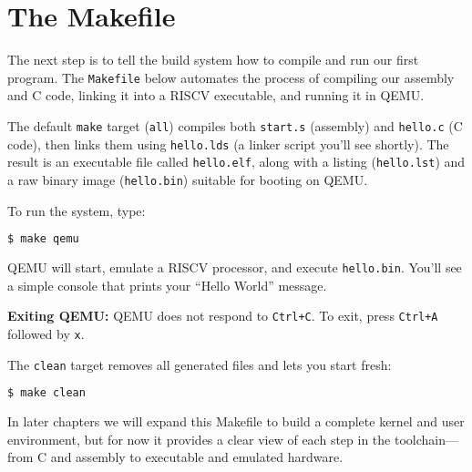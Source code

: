 \section{The Makefile}

The next step is to tell the build system how to compile and run our first
program.  The \texttt{Makefile} below automates the process of compiling our
assembly and C code, linking it into a RISC\textendash V executable, and running
it in QEMU.

\begin{figure}[H]
\centering
\begin{minipage}{0.95\textwidth}

\end{minipage}
\end{figure}

The default \texttt{make} target (\texttt{all}) compiles both
\texttt{start.s} (assembly) and \texttt{hello.c} (C code), then links them
using \texttt{hello.lds} (a linker script you’ll see shortly).  The result is an
executable file called \texttt{hello.elf}, along with a listing
(\texttt{hello.lst}) and a raw binary image (\texttt{hello.bin}) suitable for
booting on QEMU.

To run the system, type:

\begin{lstlisting}[style=oscode,language=bash]
$ make qemu
\end{lstlisting}

QEMU will start, emulate a RISC\textendash V processor, and execute
\texttt{hello.bin}.  You’ll see a simple console that prints your
``Hello World'' message.

\medskip
\noindent
\textbf{Exiting QEMU:}  
QEMU does not respond to \texttt{Ctrl+C}.  
To exit, press \texttt{Ctrl+A} followed by \texttt{x}.

\medskip
The \texttt{clean} target removes all generated files and lets you start fresh:

\begin{lstlisting}[style=oscode,language=bash]
$ make clean
\end{lstlisting}

In later chapters we will expand this Makefile to build a complete kernel and
user environment, but for now it provides a clear view of each step in the
toolchain—from C and assembly to executable and emulated hardware.
